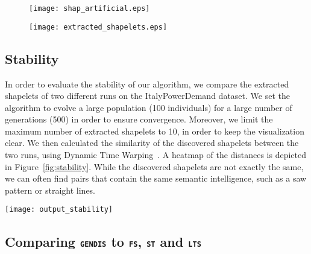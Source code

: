 \documentclass[runningheads]{llncs}
\begin{document}
\begin{figure*}
	\centering
	\begin{subfigure}{.45\textwidth}
		\centering
		\texttt{[image: shap\_artificial.eps]}
		\caption{}
		\label{fig:unlimited_discovery_sub1}
	\end{subfigure}
	\hfill
	\begin{subfigure}{.45\textwidth}
		\centering
		\texttt{[image: extracted\_shapelets.eps]}
		\caption{}
		\label{fig:unlimited_discovery_sub2}
	\end{subfigure}
	\caption{A two-class problem with two time series per class and the extracted shapelets with corresponding distances on an ordered line by a brute-force approach versus \textsc{\texttt{gendis}}. The crosses on the ordered line correspond to distances of the shapelet to the time series from Class 1 while the circles on the ordered line correspond to distances to Class 0 (the more to the right, the higher the distance).}
	\label{fig:unlimited_discovery}
\end{figure*}

\subsection{Stability}
In order to evaluate the stability of our algorithm, we compare the extracted shapelets of two different runs on the ItalyPowerDemand dataset. We set the algorithm to evolve a large population (100 individuals) for a large number of generations (500) in order to ensure convergence. Moreover, we limit the maximum number of extracted shapelets to 10, in order to keep the visualization clear. We then calculated the similarity of the discovered shapelets between the two runs, using Dynamic Time Warping~\citep{berndt1994using}. A heatmap of the distances is depicted in Figure~\ref{fig:stability}. While the discovered shapelets are not exactly the same, we can often find pairs that contain the same semantic intelligence, such as a saw pattern or straight lines.

\begin{figure*}[h!]
	\centering
	\texttt{[image: output\_stability]}
	\caption{A pairwise distance matrix, constructed using Dynamic Time Warping, between discovered shapelet sets of two different runs on the ItalyPowerDemand dataset.}
	\label{fig:stability}      
\end{figure*}

\subsection{Comparing \textsc{\texttt{gendis}} to \textsc{\texttt{fs}}, \textsc{\texttt{st}} and \textsc{\texttt{lts}}} \label{subsec:comparison}
\end{document}
